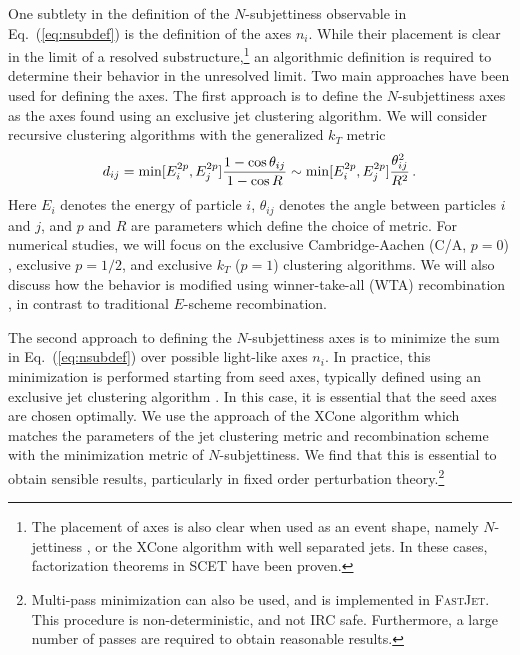 \documentclass[11pt,letterpaper]{article}
\DeclareRobustCommand{\Eq}[1]{Eq.~(\ref{#1})}
\newcommand{\fastjet}[1]{\textsc{FastJet\xspace #1}}
\begin{document}
One subtlety in the definition of the $N$-subjettiness observable in \Eq{eq:nsubdef} is the definition of the axes $n_i$. While their placement is clear in the limit of a resolved substructure,\footnote{The placement of axes is also clear when used as an event shape, namely $N$-jettiness \cite{Stewart:2010tn}, or the XCone algorithm \cite{Stewart:2015waa} with well separated jets. In these cases, factorization theorems in SCET have been proven.} an algorithmic definition is required to determine their behavior in the unresolved limit.  Two main approaches have been used for defining the axes. The first approach is to define the $N$-subjettiness axes as the axes found using an exclusive jet clustering algorithm. We will consider recursive clustering algorithms with the generalized $k_T$ metric \cite{Catani:1993hr,Cacciari:2008gp,Cacciari:2011ma}
\begin{equation}\label{eq:gen_kt_metric}
\hspace{-0.025cm} d_{ij} = \min[E_i^{2p},E_j^{2p}]\frac{1-\cos\theta_{ij}}{1-\cos R}\sim  \min[E_i^{2p},E_j^{2p}]\frac{\theta_{ij}^2}{ R^2}\,.
\end{equation}
Here $E_i$ denotes the energy of particle $i$, $\theta_{ij}$ denotes the angle between particles $i$ and $j$, and $p$ and $R$ are parameters which define the choice of metric. For numerical studies, we will focus on the exclusive Cambridge-Aachen (C/A, $p=0$) \cite{Dokshitzer:1997in,Wobisch:1998wt,Wobisch:2000dk}, exclusive $p=1/2$, and exclusive $k_T$ ($p=1$) \cite{Catani:1991hj} clustering algorithms. We will also discuss how the behavior is modified using winner-take-all (WTA) recombination  \cite{Bertolini:2013iqa,Larkoski:2014uqa,Larkoski:2014bia}, in contrast to traditional $E$-scheme recombination.




The second approach to defining the $N$-subjettiness axes is to minimize the sum in \Eq{eq:nsubdef} over possible light-like axes $n_i$. In practice, this minimization is performed starting from seed axes, typically defined using an exclusive jet clustering algorithm \cite{Thaler:2011gf,Stewart:2015waa}. In this case, it is essential that the seed axes are chosen optimally.  We use the approach of the XCone algorithm \cite{Stewart:2015waa,Thaler:2015xaa} which matches the parameters of the jet clustering metric and recombination scheme with the minimization metric of $N$-subjettiness. We find that this is essential to obtain sensible results, particularly in fixed order perturbation theory.\footnote{Multi-pass minimization can also be used, and is implemented in \fastjet{}. This procedure is non-deterministic, and not IRC safe.  Furthermore, a large number of passes are required to obtain reasonable results.} 
\end{document}
